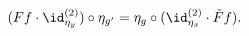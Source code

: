 \begin{equation}
\label{eq_twonat}
  (Ff\cdot\id^{(2)}_{\eta_y})\circ\eta_{g^\prime}
  = \eta_g\circ(\id^{(2)}_{\eta_x}\cdot \tilde Ff).
\end{equation}


